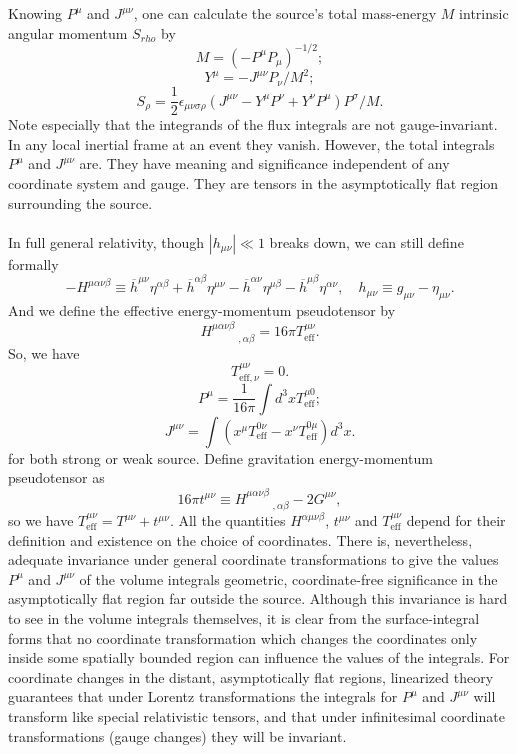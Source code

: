 \noindent
Knowing $P^{\mu}$ and $J^{\mu\nu}$, one can calculate the source's total mass-energy $M$ intrinsic angular momentum $S_{rho}$ by
\[M = (-P^{\mu}P_{\mu})^{-1/2};\]
\[Y^{\mu} = -J^{\mu\nu}P_{\nu}/M^2;\]
\[S_{\rho} = \frac{1}{2}\epsilon_{\mu\nu\sigma\rho}(J^{\mu\nu} - Y^{\mu}P^{\nu} + Y^{\nu}P^{\mu})P^{\sigma}/M.\]
Note especially that the integrands of the flux integrals  are not gauge-invariant. In any local inertial frame at an event they vanish. 
However, the total integrals $P^{\mu}$ and $J^{\mu\nu}$ are. 
They have meaning and significance independent of any coordinate system and gauge. They are tensors in the asymptotically flat region surrounding the source.
\\ \\
In full general relativity, though $|h_{\mu\nu}| \ll 1$ breaks down, we can still define formally
\[-H^{\mu\alpha\nu\beta} \equiv \overline{h}^{\mu\nu}\eta^{\alpha\beta} + \overline{h}^{\alpha\beta}\eta^{\mu\nu} - \overline{h}^{\alpha\nu}\eta^{\mu\beta} - \overline{h}^{\mu\beta}\eta^{\alpha\nu} , \quad h_{\mu\nu} \equiv g_{\mu\nu} - \eta_{\mu\nu}.\]
And we define the effective energy-momentum pseudotensor by
\[H^{\mu\alpha\nu\beta}_{\phantom{****},\alpha
\beta} = 16\pi T^{\mu\nu}_{\mathrm{eff}}.\]
So, we have
\[T^{\mu\nu}_{\mathrm{eff},\nu} = 0.\]
\[P^{\mu} = \frac{1}{16\pi} \int d^3x T^{\mu0}_{\mathrm{eff}};\]
\[J^{\mu\nu} = \int (x^{\mu} T^{0\nu}_{\mathrm{eff}} - x^{\nu} T^{0\mu}_{\mathrm{eff}}) d^3x.\]
for both strong or weak source.
Define gravitation energy-momentum pseudotensor as
\[16\pi t^{\mu\nu} \equiv H^{\mu\alpha\nu\beta}_{\phantom{****},\alpha
\beta} - 2G^{\mu\nu},\]
so we have $T^{\mu\nu}_{\mathrm{eff}} = T^{\mu\nu} + t^{\mu\nu}$. 
All the quantities $H^{\alpha\mu\nu\beta}$, $t^{\mu\nu}$ and $T^{\mu\nu}_{\mathrm{eff}}$ depend for their definition and existence on the choice of coordinates.
There is, nevertheless, adequate invariance under general coordinate transformations to give the values $P^{\mu}$ and $J^{\mu\nu}$ of the volume integrals geometric, coordinate-free significance in the asymptotically flat region far outside the source.
Although this invariance is hard to see in the volume integrals themselves, it is clear from the surface-integral forms that no coordinate transformation which changes the coordinates only inside some spatially bounded region can influence the values of the integrals. 
For coordinate changes in the distant, asymptotically
flat regions, linearized theory guarantees that under Lorentz transformations the integrals for $P^{\mu}$ and $J^{\mu\nu}$ will transform like special relativistic tensors, and that under infinitesimal coordinate transformations (gauge changes) they will be invariant.
